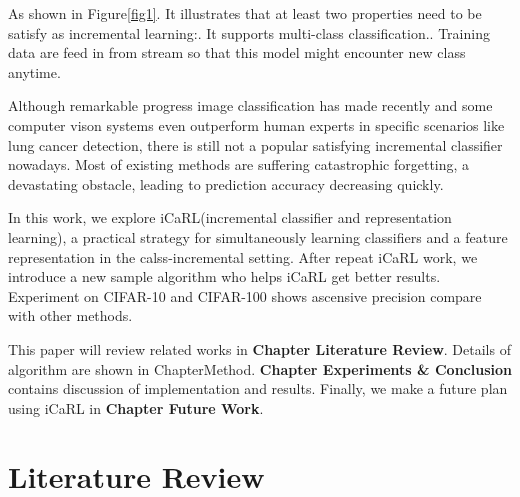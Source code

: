 \documentclass[12pt]{report}
\begin{document}
\par As shown in Figure\ref{fig1}. It illustrates that at least two properties need to be satisfy as incremental learning:. It supports multi-class classification.. Training data are feed in from stream so that this model might encounter new class anytime.
\par Although remarkable progress image classification has made recently and some computer vison systems even outperform human experts in specific scenarios like lung cancer detection\cite{cancer}, there is still not a popular satisfying incremental classifier nowadays. Most of existing methods are suffering catastrophic forgetting, a devastating obstacle, leading to prediction accuracy decreasing quickly.
\par In this work, we explore iCaRL(incremental classifier and representation learning)\cite{rebuffi}, a practical strategy for simultaneously learning classifiers and a feature representation in the calss-incremental setting. After repeat iCaRL work, we introduce a new sample algorithm who helps iCaRL get better results. Experiment on CIFAR-10 and CIFAR-100 shows ascensive precision compare with other methods.
\par This paper will review related works in \textbf{Chapter Literature Review}. Details of algorithm are shown in Chapter{Method}. \textbf{Chapter Experiments \& Conclusion} contains discussion of implementation and results. Finally, we make a future plan using iCaRL in \textbf{Chapter Future Work}.
\chapter{Literature Review}
\end{document}
